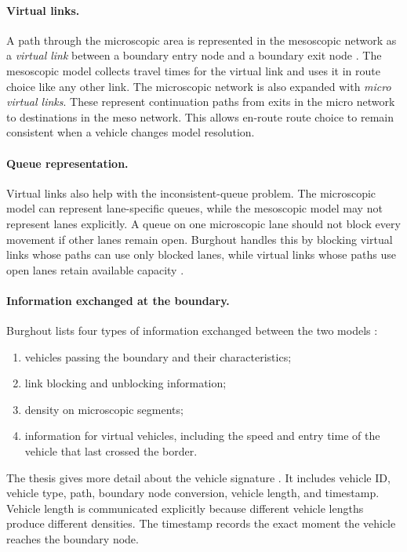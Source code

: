 \begin{bibunit}[plainnat]
\paragraph*{Virtual links.}
A path through the microscopic area is represented in the mesoscopic network
as a \textit{virtual link} between a boundary entry node and a boundary exit
node \citep{burghout2004thesis,burghout2005hybrid}. The mesoscopic model
collects travel times for the virtual link and uses it in route choice like any
other link. The microscopic network is also expanded with \textit{micro virtual
links}. These represent continuation paths from exits in the micro network to
destinations in the meso network. This allows en-route route choice to remain
consistent when a vehicle changes model resolution.

\paragraph*{Queue representation.}
Virtual links also help with the inconsistent-queue problem. The microscopic
model can represent lane-specific queues, while the mesoscopic model may not
represent lanes explicitly. A queue on one microscopic lane should not block
every movement if other lanes remain open. Burghout handles this by blocking
virtual links whose paths can use only blocked lanes, while virtual links whose
paths use open lanes retain available capacity \citep{burghout2005hybrid}.

\paragraph*{Information exchanged at the boundary.}
Burghout lists four types of information exchanged between the two models
\citep{burghout2005hybrid}:
\begin{enumerate}
  \item vehicles passing the boundary and their characteristics;
  \item link blocking and unblocking information;
  \item density on microscopic segments;
  \item information for virtual vehicles, including the speed and entry time
        of the vehicle that last crossed the border.
\end{enumerate}

The thesis gives more detail about the vehicle signature
\citep{burghout2004thesis}. It includes vehicle ID, vehicle type, path,
boundary node conversion, vehicle length, and timestamp. Vehicle length is
communicated explicitly because different vehicle lengths produce different
densities. The timestamp records the exact moment the vehicle reaches the
boundary node.


\end{bibunit}
